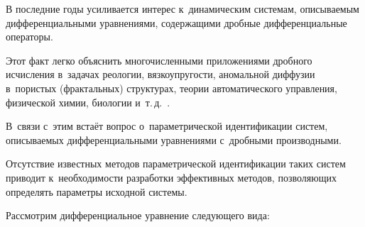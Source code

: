 











\date{13/IX/2011}




\maketitle



В последние годы усиливается интерес к~динамическим системам, описываемым дифференциальными уравнениями, содержащими дробные дифференциальные операторы. 

Этот факт легко объяснить многочисленными приложениями дробного исчисления в~задачах реологии, вязкоупругости, аномальной диффузии в~пористых (фрактальных) структурах, теории автоматического управления, физической химии, биологии и~т.\,д.~\cite{a:K}. 

В~связи с~этим встаёт вопрос о~параметрической идентификации систем, описываемых дифференциальными уравнениями с~дробными производными. 

Отсутствие известных методов параметрической идентификации таких систем приводит к~необходимости разработки эффективных методов, позволяющих определять параметры исходной системы. 



Рассмотрим дифференциальное уравнение следующего вида:

